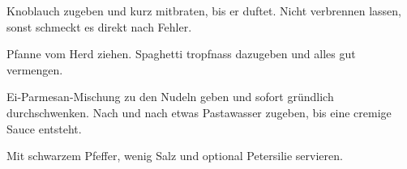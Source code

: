 \begin{recipe}
{    \step%
    Knoblauch zugeben und kurz mitbraten, bis er duftet. Nicht verbrennen lassen, sonst schmeckt es direkt nach Fehler.
    
    \step%
    Pfanne vom Herd ziehen. Spaghetti tropfnass dazugeben und alles gut vermengen.
    
    \step%
    Ei-Parmesan-Mischung zu den Nudeln geben und sofort gründlich durchschwenken. Nach und nach etwas Pastawasser zugeben, bis eine cremige Sauce entsteht.
    
    \step%
    Mit schwarzem Pfeffer, wenig Salz und optional Petersilie servieren.
}



\end{recipe}